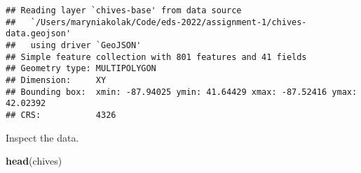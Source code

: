 \documentclass[]{tufte-handout}
\newenvironment{Shaded}{}{}
\newcommand{\KeywordTok}[1]{\textcolor[rgb]{0.00,0.44,0.13}{\textbf{#1}}}
\newcommand{\NormalTok}[1]{#1}
\begin{document}
\begin{verbatim}
## Reading layer `chives-base' from data source 
##   `/Users/maryniakolak/Code/eds-2022/assignment-1/chives-data.geojson' 
##   using driver `GeoJSON'
## Simple feature collection with 801 features and 41 fields
## Geometry type: MULTIPOLYGON
## Dimension:     XY
## Bounding box:  xmin: -87.94025 ymin: 41.64429 xmax: -87.52416 ymax: 42.02392
## CRS:           4326
\end{verbatim}

Inspect the data.

\begin{Shaded}
\begin{Highlighting}[]
\KeywordTok{head}\NormalTok{(chives)}
\end{Highlighting}
\end{Shaded}
\end{document}
